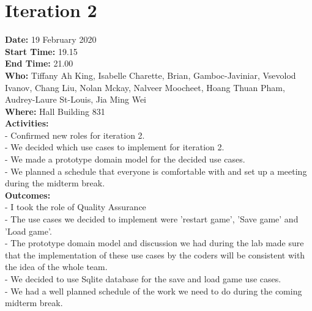 \documentclass[12pt]{article}
\begin{document}

\newpage 
\section{Iteration 2}

{\bf Date:} 19 February 2020 \\
{\bf Start Time:} 19.15 \\
{\bf End Time:} 21.00 \\
{\bf Who:} Tiffany Ah King, Isabelle Charette, Brian, Gamboc-Javiniar, Vsevolod Ivanov, Chang Liu, Nolan Mckay, Nalveer Moocheet, Hoang Thuan Pham, Audrey-Laure St-Louis, Jia Ming Wei \\
{\bf Where:} Hall Building 831 \\
{\bf Activities:}\\
- Confirmed new roles for iteration 2.\\
- We decided which use cases to implement for iteration 2.\\
- We made a prototype domain model for the decided use cases.\\
- We planned a schedule that everyone is comfortable with and set up a meeting during the midterm break.\\
{\bf Outcomes:}\\
- I took the role of Quality Assurance\\
- The use cases we decided to implement were 'restart game', 'Save game' and 'Load game'.\\
- The prototype domain model and discussion we had during the lab made sure that the implementation of these use cases by the coders will be consistent with the idea of the whole team.\\
- We decided to use Sqlite database for the save and load game use cases.\\
- We had a well planned schedule of the work we need to do during the coming midterm break.\\
\end{document}
